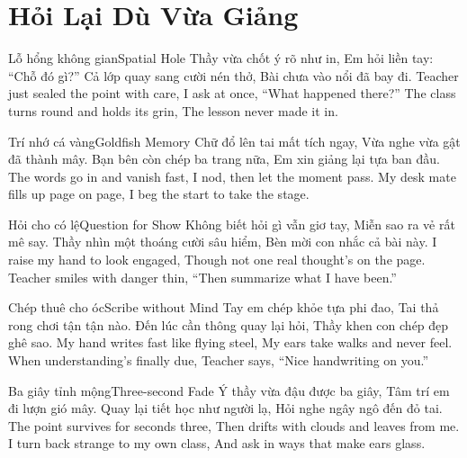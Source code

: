 \chapter{Hỏi Lại Dù Vừa Giảng}

\begin{tutuyetbox}{Lỗ hổng không gian}{Spatial Hole}
Thầy vừa chốt ý rõ như in,
Em hỏi liền tay: “Chỗ đó gì?”
Cả lớp quay sang cười nén thở,
Bài chưa vào nổi đã bay đi.
\tcblower
Teacher just sealed the point with care,
I ask at once, “What happened there?”
The class turns round and holds its grin,
The lesson never made it in.
\end{tutuyetbox}

\begin{tutuyetbox}{Trí nhớ cá vàng}{Goldfish Memory}
Chữ đổ lên tai mất tích ngay,
Vừa nghe vừa gật đã thành mây.
Bạn bên còn chép ba trang nữa,
Em xin giảng lại tựa ban đầu.
\tcblower
The words go in and vanish fast,
I nod, then let the moment pass.
My desk mate fills up page on page,
I beg the start to take the stage.
\end{tutuyetbox}

\begin{tutuyetbox}{Hỏi cho có lệ}{Question for Show}
Không biết hỏi gì vẫn giơ tay,
Miễn sao ra vẻ rất mê say.
Thầy nhìn một thoáng cười sâu hiểm,
Bèn mời con nhắc cả bài này.
\tcblower
I raise my hand to look engaged,
Though not one real thought's on the page.
Teacher smiles with danger thin,
“Then summarize what I have been.”
\end{tutuyetbox}

\begin{tutuyetbox}{Chép thuê cho óc}{Scribe without Mind}
Tay em chép khỏe tựa phi đao,
Tai thả rong chơi tận tận nào.
Đến lúc cần thông quay lại hỏi,
Thầy khen con chép đẹp ghê sao.
\tcblower
My hand writes fast like flying steel,
My ears take walks and never feel.
When understanding's finally due,
Teacher says, “Nice handwriting on you.”
\end{tutuyetbox}

\begin{tutuyetbox}{Ba giây tỉnh mộng}{Three-second Fade}
Ý thầy vừa đậu được ba giây,
Tâm trí em đi lượn gió mây.
Quay lại tiết học như người lạ,
Hỏi nghe ngây ngô đến đỏ tai.
\tcblower
The point survives for seconds three,
Then drifts with clouds and leaves from me.
I turn back strange to my own class,
And ask in ways that make ears glass.
\end{tutuyetbox}

